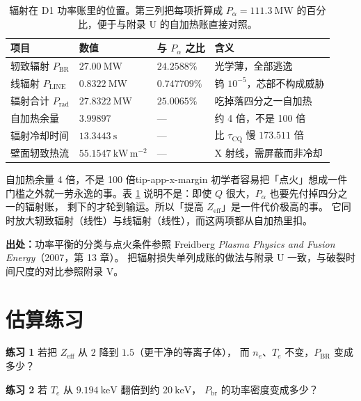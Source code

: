 \begin{table}[htbp]
\centering
\small
\caption{辐射在 D1 功率账里的位置。第三列把每项折算成 $P_\alpha=111.3\ \mathrm{MW}$
的百分比，便于与附录 U 的自加热账直接对照。}
\label{tab:app-x-budget}
\begin{tabular}{p{3.0cm}p{3.0cm}p{3.2cm}p{4.2cm}}
\toprule
项目 & 数值 & 与 $P_\alpha$ 之比 & 含义 \\
\midrule
轫致辐射 $P_{\mathrm{BR}}$ & $27.00\ \mathrm{MW}$ & $24.2588\%$ & 光学薄，全部逃逸 \\
线辐射 $P_{\mathrm{LINE}}$ & $0.8322\ \mathrm{MW}$ & $0.747709\%$ & 钨 $10^{-5}$，芯部不构成威胁 \\
辐射合计 $P_{\mathrm{rad}}$ & $27.8322\ \mathrm{MW}$ & $25.0065\%$ & 吃掉落四分之一自加热 \\
自加热余量 & $3.99897$ & --- & 约 4 倍，不是 100 倍 \\
辐射冷却时间 & $13.3443\ \mathrm{s}$ & --- & 比 $\tau_{\mathrm{CQ}}$ 慢 $173.511$ 倍 \\
壁面轫致热流 & $55.1547\ \mathrm{kW\,m^{-2}}$ & --- & X 射线，需屏蔽而非冷却 \\
\bottomrule
\end{tabular}

\end{table}

\begin{tip}{自加热余量 4 倍，不是 100 倍}{tip-app-x-margin}
初学者容易把「点火」想成一件门槛之外就一劳永逸的事。表 \ref{tab:app-x-budget}
说明不是：即使 $Q$ 很大，$P_\alpha$ 也要先付掉四分之一的辐射账，
剩下的才轮到输运。所以「提高 $Z_{\mathrm{eff}}$」是一件代价极高的事。
它同时放大轫致辐射（线性）与线辐射（线性），而这两项都从自加热里扣。
\end{tip}

{\footnotesize
\textbf{出处：}功率平衡的分类与点火条件参照 Freidberg
\emph{Plasma Physics and Fusion Energy}（2007，第 13 章）。
把辐射损失单列成账的做法与附录 U 一致，与破裂时间尺度的对比参照附录 V。
}

\section{估算练习}
\label{sec:app-x-problems}

\textbf{练习 1} 若把 $Z_{\mathrm{eff}}$ 从 $2$ 降到 $1.5$（更干净的等离子体），
而 $n_e$、$T_e$ 不变，$P_{\mathrm{BR}}$ 变成多少？

\textbf{练习 2} 若 $T_e$ 从 $9.194\ \mathrm{keV}$ 翻倍到约 $20\ \mathrm{keV}$，
$P_{\mathrm{br}}$ 的功率密度变成多少？

